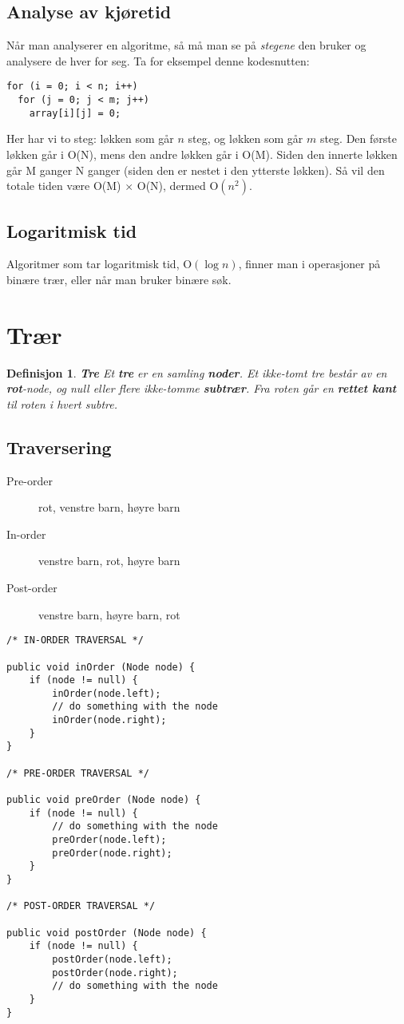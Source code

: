 \documentclass[11pt,a4paper]{article}
\theoremstyle{def}
\newtheorem{definition}[subsection]{Definisjon}
\begin{document}
\subsection{Analyse av kjøretid}
Når man analyserer en algoritme, så må man se på \textit{stegene} den bruker og analysere de hver for seg. Ta for eksempel denne kodesnutten:
\begin{Verbatim}[frame=single]
for (i = 0; i < n; i++)
  for (j = 0; j < m; j++)
    array[i][j] = 0;
\end{Verbatim}
Her har vi to steg: løkken som går $n$ steg, og løkken som går $m$ steg. Den første løkken går i O(N), mens den andre løkken går i O(M). Siden den innerte løkken går M ganger N ganger (siden den er nestet i den ytterste løkken). Så vil den totale tiden være O(M) $\times$ O(N), dermed O$(n^2)$.

\subsection{Logaritmisk tid}
Algoritmer som tar logaritmisk tid, O$(\log n)$, finner man i operasjoner på binære trær, eller når man bruker binære søk.



\section{Trær}

\begin{definition}
\emph{\textbf{Tre}}
Et \textbf{tre} er en samling \textbf{noder}. Et ikke-tomt tre består av en \textbf{rot}-node, og null eller flere ikke-tomme \textbf{subtrær}. Fra roten går en \textbf{rettet kant} til roten i hvert subtre.
\end{definition}

\subsection{Traversering}
\begin{description}
\item[Pre-order] rot, venstre barn, høyre barn
\item[In-order] venstre barn, rot, høyre barn
\item[Post-order] venstre barn, høyre barn, rot
\end{description}

\begin{lstlisting}
/* IN-ORDER TRAVERSAL */

public void inOrder (Node node) {
	if (node != null) {
		inOrder(node.left);
		// do something with the node
		inOrder(node.right);
	}
}

/* PRE-ORDER TRAVERSAL */

public void preOrder (Node node) {
	if (node != null) {
		// do something with the node
		preOrder(node.left);
		preOrder(node.right);
	}
}

/* POST-ORDER TRAVERSAL */

public void postOrder (Node node) {
	if (node != null) {
		postOrder(node.left);
		postOrder(node.right);
		// do something with the node
	}
}
\end{lstlisting}
\end{document}
